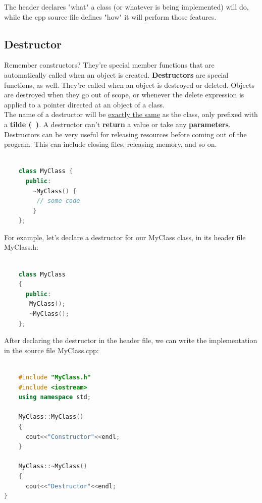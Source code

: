 \documentclass[12pt , a4paper]{article}
\begin{document}
The header declares "what" a class (or whatever is being implemented) will do, while the cpp source file defines "how" it will perform those features.

	\subsection{Destructor}
	Remember constructors? They're special member functions that are automatically called when an object is created. \textbf{Destructors} are special functions, as well. They're called when an object is destroyed or deleted. Objects are destroyed when they go out of scope, or whenever the delete expression is applied to a pointer directed at an object of a class.\\
	The name of a destructor will be \underline{exactly the same} as the class, only prefixed with a \textbf{tilde (~)}. A destructor can't \textbf{return} a value or take any \textbf{parameters}. Destructors can be very useful for releasing resources before coming out of the program. This can include closing files, releasing memory, and so on.

	\begin{lstlisting}[language=C++]

	class MyClass {
	  public: 
	    ~MyClass() {
	     // some code
	    }
	};
	\end{lstlisting}

For example, let's declare a destructor for our MyClass class, in its header file MyClass.h:
	\begin{lstlisting}[language=C++]

	class MyClass
	{
	  public:
	   MyClass();
	   ~MyClass();
	};
	\end{lstlisting}

After declaring the destructor in the header file, we can write the implementation in the source file MyClass.cpp:
	\begin{lstlisting}[language=C++]

	#include "MyClass.h"
	#include <iostream>
	using namespace std;
	
	MyClass::MyClass()
	{
	  cout<<"Constructor"<<endl;
	}
	
	MyClass::~MyClass()
	{
	  cout<<"Destructor"<<endl;
}
	\end{lstlisting}
\end{document}
